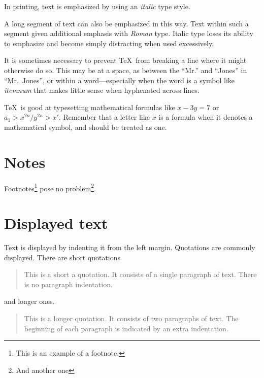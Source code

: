 \documentclass[aoas,preprint]{imsart}
\numberwithin{equation}{section}
\theoremstyle{plain}
\begin{document}
{In printing, text is emphasized by using an
       {\em italic\/}  %
type style.

\begin{em}
   A long segment of text can also be emphasized in this way.  Text within
   such a segment given additional emphasis
      with\/ {\em Roman}
   type.  Italic type loses its ability to emphasize and become simply
   distracting when used excessively.
\end{em}

It is sometimes necessary to prevent \TeX\ from breaking a line where
it might otherwise do so.  This may be at a space, as between the
``Mr.'' and ``Jones'' in
       ``Mr.~Jones'',        %
or within a word---especially when the word is a symbol like
       \mbox{\em itemnum\/}
that makes little sense when hyphenated across
       lines.

\TeX\ is good at typesetting mathematical formulas like
       \( x-3y = 7 \)
or
       \( a_{1} > x^{2n} / y^{2n} > x' \).
Remember that a letter like
       $x$        %
is a formula when it denotes a mathematical symbol, and should
be treated as one.


\section{Notes}
Footnotes\footnote{This is an example of a footnote.}
pose no problem\footnote{And another one}.

\section{Displayed text}

Text is displayed by indenting it from the left margin.
Quotations are commonly displayed.  There are short quotations
\begin{quote}
   This is a short a quotation.  It consists of a
   single paragraph of text.  There is no paragraph
   indentation.
\end{quote}
and longer ones.
\begin{quotation}
   This is a longer quotation.  It consists of two paragraphs
   of text.  The beginning of each paragraph is indicated
   by an extra indentation.


\end{quotation}}
\end{document}
